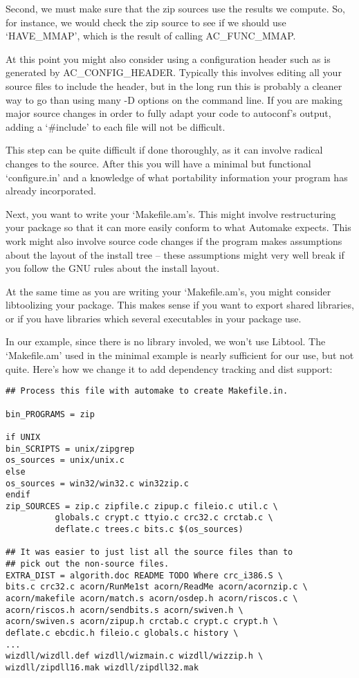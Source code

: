 Second, we must make sure that the zip sources use the results we compute. So, for instance, we would check the zip source to see if we should use `HAVE\_{}MMAP', which is the result of calling AC\_{}FUNC\_{}MMAP.

At this point you might also consider using a configuration header such 
as is generated by AC\_{}CONFIG\_{}HEADER. Typically this involves 
editing all your source files to include the header, but in the long run 
this is probably a cleaner way to go than using many -D options on the 
command line. If you are making major source changes in order to fully 
adapt your code to autoconf's output, adding a `\#include' to each file will 
not be difficult.

This step can be quite difficult if done thoroughly, as it can involve radical changes to the source. After this you will have a minimal but functional `configure.in' and a knowledge of what portability information your program has already incorporated.

Next, you want to write your `Makefile.am's. This might involve restructuring your package so that it can more easily conform to what Automake expects. This work might also involve source code changes if the program makes assumptions about the layout of the install tree -- these assumptions might very well break if you follow the GNU rules about the install layout.

At the same time as you are writing your `Makefile.am's, you might consider libtoolizing your package. This makes sense if you want to export shared libraries, or if you have libraries which several executables in your package use.

In our example, since there is no library involed, we won't use Libtool. The `Makefile.am' used in the minimal example is nearly sufficient for our use, but not quite. Here's how we change it to add dependency tracking and dist support: 

\begin{Verbatim}[frame=single]
## Process this file with automake to create Makefile.in.

bin_PROGRAMS = zip

if UNIX
bin_SCRIPTS = unix/zipgrep
os_sources = unix/unix.c
else
os_sources = win32/win32.c win32zip.c
endif
zip_SOURCES = zip.c zipfile.c zipup.c fileio.c util.c \
	      globals.c crypt.c ttyio.c crc32.c crctab.c \
	      deflate.c trees.c bits.c $(os_sources)

## It was easier to just list all the source files than to 
## pick out the non-source files.
EXTRA_DIST = algorith.doc README TODO Where crc_i386.S \
bits.c crc32.c acorn/RunMe1st acorn/ReadMe acorn/acornzip.c \
acorn/makefile acorn/match.s acorn/osdep.h acorn/riscos.c \
acorn/riscos.h acorn/sendbits.s acorn/swiven.h \
acorn/swiven.s acorn/zipup.h crctab.c crypt.c crypt.h \
deflate.c ebcdic.h fileio.c globals.c history \
...
wizdll/wizdll.def wizdll/wizmain.c wizdll/wizzip.h \
wizdll/zipdll16.mak wizdll/zipdll32.mak
\end{Verbatim}

